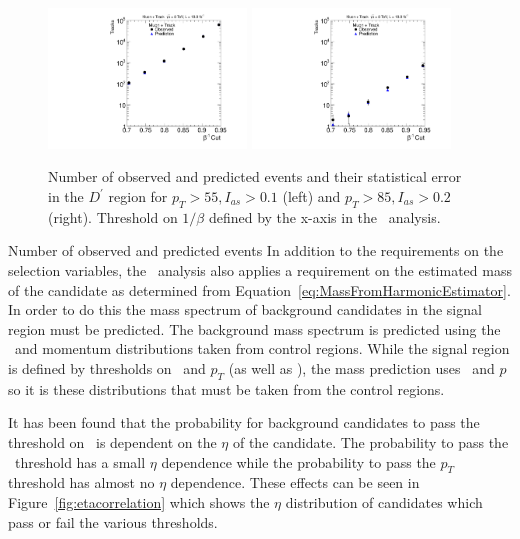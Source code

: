 \begin{figure}
\begin{center}
\includegraphics[clip=true, trim=0.0cm 0cm 3.0cm 0cm, width=0.47\textwidth]{figures/tkmu/Pred_Flip_I010_Pt55_Data8TeV}
\includegraphics[clip=true, trim=0.0cm 0cm 3.0cm 0cm, width=0.47\textwidth]{figures/tkmu/Pred_Flip_I020_Pt85_Data8TeV}
\caption[Number of observed and predicted events in the \invbeta\ $<$ 1 region in the \tktof\ analysis.]
{Number of observed and predicted events and their statistical error in the $D^\prime$ region for $p_T>55, I_{as}>0.1$ (left)
and $p_T>85, I_{as}>0.2$ (right). Threshold on $1/\beta$ defined by the x-axis
in the \tktof\ analysis.}
\label{fig:PredFlipTkTOF}
\end{center}
\end{figure}
Number of observed and predicted events
In addition to the requirements on the selection variables, the \tktof\ analysis also applies a requirement on the estimated mass of the candidate as determined from 
Equation~\ref{eq:MassFromHarmonicEstimator}. In order to do this the mass spectrum of background candidates in the signal region must be predicted.
The background mass spectrum is predicted using the \dedx\ and momentum distributions taken from control regions. While the signal region is defined by thresholds on \ias\ and
$p_T$ (as well as \invbeta), the mass prediction uses \ih\ and $p$ so it is these distributions that must be taken from the control regions. 

It has been found that the probability for background candidates to pass the threshold on \ias\ is dependent on the $\eta$ of the candidate.
The probability to pass the \invbeta\ threshold has a small $\eta$
dependence while the probability to pass the $p_T$ threshold has almost no $\eta$ dependence. These effects can be seen in Figure~\ref{fig:etacorrelation} which shows the $\eta$
distribution of candidates which
pass or fail the various thresholds. 

